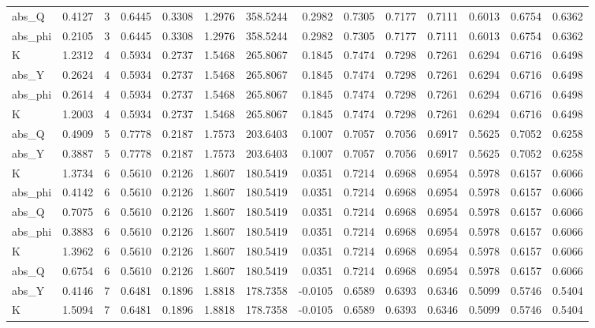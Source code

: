 \begin{tabular}{lrrrrrrrrrrrrr}
abs\_Q & 0.4127 & 3 & 0.6445 & 0.3308 & 1.2976 & 358.5244 & 0.2982 & 0.7305 & 0.7177 & 0.7111 & 0.6013 & 0.6754 & 0.6362 \\
abs\_phi & 0.2105 & 3 & 0.6445 & 0.3308 & 1.2976 & 358.5244 & 0.2982 & 0.7305 & 0.7177 & 0.7111 & 0.6013 & 0.6754 & 0.6362 \\
K & 1.2312 & 4 & 0.5934 & 0.2737 & 1.5468 & 265.8067 & 0.1845 & 0.7474 & 0.7298 & 0.7261 & 0.6294 & 0.6716 & 0.6498 \\
abs\_Y & 0.2624 & 4 & 0.5934 & 0.2737 & 1.5468 & 265.8067 & 0.1845 & 0.7474 & 0.7298 & 0.7261 & 0.6294 & 0.6716 & 0.6498 \\
abs\_phi & 0.2614 & 4 & 0.5934 & 0.2737 & 1.5468 & 265.8067 & 0.1845 & 0.7474 & 0.7298 & 0.7261 & 0.6294 & 0.6716 & 0.6498 \\
K & 1.2003 & 4 & 0.5934 & 0.2737 & 1.5468 & 265.8067 & 0.1845 & 0.7474 & 0.7298 & 0.7261 & 0.6294 & 0.6716 & 0.6498 \\
abs\_Q & 0.4909 & 5 & 0.7778 & 0.2187 & 1.7573 & 203.6403 & 0.1007 & 0.7057 & 0.7056 & 0.6917 & 0.5625 & 0.7052 & 0.6258 \\
abs\_Y & 0.3887 & 5 & 0.7778 & 0.2187 & 1.7573 & 203.6403 & 0.1007 & 0.7057 & 0.7056 & 0.6917 & 0.5625 & 0.7052 & 0.6258 \\
K & 1.3734 & 6 & 0.5610 & 0.2126 & 1.8607 & 180.5419 & 0.0351 & 0.7214 & 0.6968 & 0.6954 & 0.5978 & 0.6157 & 0.6066 \\
abs\_phi & 0.4142 & 6 & 0.5610 & 0.2126 & 1.8607 & 180.5419 & 0.0351 & 0.7214 & 0.6968 & 0.6954 & 0.5978 & 0.6157 & 0.6066 \\
abs\_Q & 0.7075 & 6 & 0.5610 & 0.2126 & 1.8607 & 180.5419 & 0.0351 & 0.7214 & 0.6968 & 0.6954 & 0.5978 & 0.6157 & 0.6066 \\
abs\_phi & 0.3883 & 6 & 0.5610 & 0.2126 & 1.8607 & 180.5419 & 0.0351 & 0.7214 & 0.6968 & 0.6954 & 0.5978 & 0.6157 & 0.6066 \\
K & 1.3962 & 6 & 0.5610 & 0.2126 & 1.8607 & 180.5419 & 0.0351 & 0.7214 & 0.6968 & 0.6954 & 0.5978 & 0.6157 & 0.6066 \\
abs\_Q & 0.6754 & 6 & 0.5610 & 0.2126 & 1.8607 & 180.5419 & 0.0351 & 0.7214 & 0.6968 & 0.6954 & 0.5978 & 0.6157 & 0.6066 \\
abs\_Y & 0.4146 & 7 & 0.6481 & 0.1896 & 1.8818 & 178.7358 & -0.0105 & 0.6589 & 0.6393 & 0.6346 & 0.5099 & 0.5746 & 0.5404 \\
K & 1.5094 & 7 & 0.6481 & 0.1896 & 1.8818 & 178.7358 & -0.0105 & 0.6589 & 0.6393 & 0.6346 & 0.5099 & 0.5746 & 0.5404 \\

\end{tabular}
